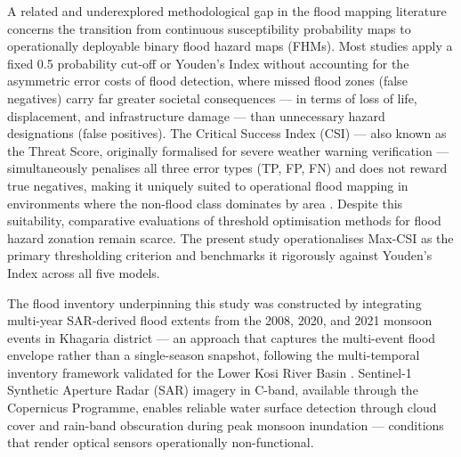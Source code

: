 \documentclass[12pt, a4paper]{article}
\begin{document}
A related and underexplored methodological gap in the flood mapping literature concerns the transition from continuous susceptibility probability maps to operationally deployable binary flood hazard maps (FHMs). Most studies apply a fixed 0.5 probability cut-off or Youden's Index \citep{youden1950} without accounting for the asymmetric error costs of flood detection, where missed flood zones (false negatives) carry far greater societal consequences --- in terms of loss of life, displacement, and infrastructure damage --- than unnecessary hazard designations (false positives). The Critical Success Index (CSI) --- also known as the Threat Score, originally formalised for severe weather warning verification \citep{schaefer1990} --- simultaneously penalises all three error types (TP, FP, FN) and does not reward true negatives, making it uniquely suited to operational flood mapping in environments where the non-flood class dominates by area \citep{mason2003, Pham2021, nguyen2021}. Despite this suitability, comparative evaluations of threshold optimisation methods for flood hazard zonation remain scarce. The present study operationalises Max-CSI as the primary thresholding criterion and benchmarks it rigorously against Youden's Index across all five models.

The flood inventory underpinning this study was constructed by integrating multi-year SAR-derived flood extents from the 2008, 2020, and 2021 monsoon events in Khagaria district --- an approach that captures the multi-event flood envelope rather than a single-season snapshot, following the multi-temporal inventory framework validated for the Lower Kosi River Basin \citep{Arora2022SERRA}. Sentinel-1 Synthetic Aperture Radar (SAR) imagery in C-band, available through the Copernicus Programme, enables reliable water surface detection through cloud cover and rain-band obscuration during peak monsoon inundation \citep{Twele2016, DeVries2020, dasgupta2018} --- conditions that render optical sensors operationally non-functional.
\end{document}
